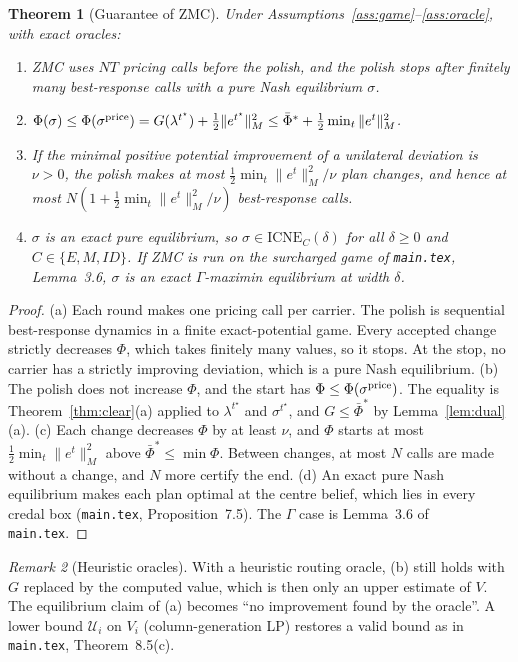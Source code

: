 \documentclass[11pt]{article}
\newtheorem{theorem}{Theorem}
\theoremstyle{definition}
\theoremstyle{remark}
\newtheorem{remark}[theorem]{Remark}
\newcommand{\ICNE}{\mathrm{ICNE}}
\begin{document}
\begin{theorem}[Guarantee of ZMC]\label{thm:zmc}
Under Assumptions~\ref{ass:game}--\ref{ass:oracle}, with exact oracles:
\begin{enumerate}[label=(\alph*)]
\item ZMC uses $NT$ pricing calls before the polish, and the polish stops after finitely many best-response calls with a pure Nash equilibrium $\sigma$.
\item $\Phi(\sigma)\le\Phi(\sigma^{\rm price})=G(\lambda^{t^\star})+\tfrac12\|e^{t^\star}\|_M^2\le\bar\Phi^*+\tfrac12\min_t\|e^t\|^2_M$.
\item If the minimal positive potential improvement of a unilateral deviation is $\nu>0$, the polish makes at most $\tfrac12\min_t\|e^t\|_M^2/\nu$ plan changes, and hence at most $N(1+\tfrac12\min_t\|e^t\|^2_M/\nu)$ best-response calls.
\item $\sigma$ is an exact pure equilibrium, so $\sigma\in\ICNE_C(\delta)$ for all $\delta\ge0$ and $C\in\{E,M,ID\}$. If ZMC is run on the surcharged game of \texttt{main.tex}, Lemma~3.6, $\sigma$ is an exact $\Gamma$-maximin equilibrium at width $\delta$.
\end{enumerate}
\end{theorem}
\begin{proof}
(a) Each round makes one pricing call per carrier. The polish is sequential best-response dynamics in a finite exact-potential game. Every accepted change strictly decreases $\Phi$, which takes finitely many values, so it stops. At the stop, no carrier has a strictly improving deviation, which is a pure Nash equilibrium.
(b) The polish does not increase $\Phi$, and the start has $\Phi\le\Phi(\sigma^{\rm price})$. The equality is Theorem~\ref{thm:clear}(a) applied to $\lambda^{t^\star}$ and $\sigma^{t^\star}$, and $G\le\bar\Phi^*$ by Lemma~\ref{lem:dual}(a).
(c) Each change decreases $\Phi$ by at least $\nu$, and $\Phi$ starts at most $\tfrac12\min_t\|e^t\|^2_M$ above $\bar\Phi^*\le\min\Phi$. Between changes, at most $N$ calls are made without a change, and $N$ more certify the end.
(d) An exact pure Nash equilibrium makes each plan optimal at the centre belief, which lies in every credal box (\texttt{main.tex}, Proposition~7.5). The $\Gamma$ case is Lemma~3.6 of \texttt{main.tex}.
\end{proof}

\begin{remark}[Heuristic oracles]
With a heuristic routing oracle, (b) still holds with $G$ replaced by the computed value, which is then only an upper estimate of $V$. The equilibrium claim of (a) becomes ``no improvement found by the oracle''. A lower bound $\mathcal U_i$ on $V_i$ (column-generation LP) restores a valid bound as in \texttt{main.tex}, Theorem~8.5(c).
\end{remark}
\end{document}
